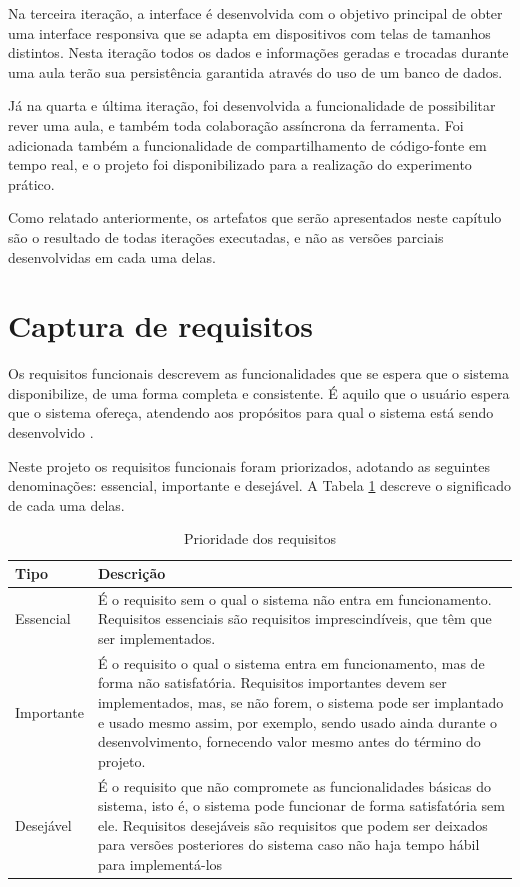 Na terceira iteração, a interface é desenvolvida com o objetivo principal de obter uma interface responsiva que se adapta em dispositivos com telas de tamanhos distintos. Nesta iteração todos os dados e informações geradas e trocadas durante uma aula terão sua persistência garantida através do uso de um banco de dados.

Já na quarta e última iteração, foi desenvolvida a funcionalidade de possibilitar rever uma aula, e também toda colaboração assíncrona da ferramenta. Foi adicionada também a funcionalidade de compartilhamento de código-fonte em tempo real, e o projeto foi disponibilizado para a realização do experimento prático.

Como relatado anteriormente, os artefatos que serão apresentados neste capítulo são o resultado de todas iterações executadas, e não as versões parciais desenvolvidas em cada uma delas.

\section{Captura de requisitos}

Os requisitos funcionais descrevem as funcionalidades que se espera que o sistema disponibilize, de uma forma completa e consistente. É aquilo que o usuário espera que o sistema ofereça, atendendo aos propósitos para qual o sistema está sendo desenvolvido \cite{padua05}.

Neste projeto os requisitos funcionais foram priorizados, adotando as seguintes denominações: essencial, importante e desejável. A Tabela \ref{tab:prioridade_req} descreve o significado de cada uma delas.

\bgroup
\def\arraystretch{1.5} %
\begin{table}[h]{} %
\caption{Prioridade dos requisitos}
\centering
\begin{tabular}{ | p{3cm} | p{10cm}| } \hline
\textbf{Tipo} & \textbf{Descrição} \\ \hline
Essencial & É o requisito sem o qual o sistema não entra em funcionamento. Requisitos essenciais são requisitos imprescindíveis, que têm que ser implementados.  \\ \hline
Importante  & É o requisito o qual o sistema entra em funcionamento, mas de forma não satisfatória. Requisitos importantes devem ser implementados, mas, se não forem, o sistema pode ser implantado e usado mesmo assim, por exemplo, sendo usado ainda durante o desenvolvimento, fornecendo valor mesmo antes do término do projeto.  \\ \hline
Desejável  & É o requisito que não compromete as funcionalidades básicas do sistema, isto é, o sistema pode funcionar de forma satisfatória sem ele. Requisitos desejáveis são requisitos que podem ser deixados para versões posteriores do sistema caso não haja tempo hábil para implementá-los  \\ \hline
\end{tabular}
\label{tab:prioridade_req}
\end{table}
\egroup

